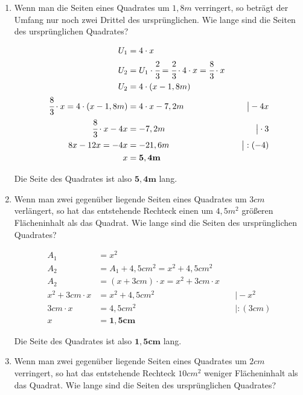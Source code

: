 \documentclass[a4paper,10pt]{article} %
\begin{document}
\begin{enumerate}
    Die Seite des Quadrates ist also \(\mathbf{5cm}\) lang.

  \item Wenn man die Seiten eines Quadrates um \(1,8m\) verringert, so beträgt der
    Umfang nur noch zwei Drittel des ursprünglichen.
    Wie lange sind die Seiten des ursprünglichen Quadrates?

    \[
      \begin{aligned}
        U_1 &= 4 \cdot x \\
        U_2 &= U_1 \cdot \cfrac{2}{3} = \cfrac{2}{3} \cdot 4 \cdot x = \cfrac{8}{3} \cdot x \\
        U_2 &= 4 \cdot (x - 1,8m) \\
        \cfrac{8}{3} \cdot x = 4 \cdot (x - 1,8m) &= 4 \cdot x - 7,2m &\quad\big| - 4x \\
        \cfrac{8}{3} \cdot x - 4x &= -7,2m &\quad\big| \cdot 3 \\
        8x - 12x = -4x &= -21,6m &\quad\big| : (-4) \\
        x &= \mathbf{5,4m}
      \end{aligned}
    \]

    Die Seite des Quadrates ist also \(\mathbf{5,4m}\) lang.

  \item Wenn man zwei gegenüber liegende Seiten eines Quadrates um \(3cm\) verlängert,
    so hat das entstehende Rechteck einen um \(4,5m^2\) größeren Flächeninhalt als das Quadrat.
    Wie lange sind die Seiten des ursprünglichen Quadrates?

    \[
      \begin{aligned}
        A_1 &= x^2 \\
        A_2 &= A_1 + 4,5cm^2 = x^2 + 4,5cm^2 \\
        A_2 &= (x + 3cm) \cdot x = x^2 + 3cm \cdot x \\
        x^2 + 3cm \cdot x &= x^2 + 4,5cm^2 &\quad\big| - x^2 \\
        3cm \cdot x &= 4,5cm^2 &\quad\big| : (3cm) \\
        x &= \mathbf{1,5cm}
      \end{aligned}
    \]

    Die Seite des Quadrates ist also \(\mathbf{1,5cm}\) lang.

  \item Wenn man zwei gegenüber liegende Seiten eines Quadrates um \(2cm\) verringert,
    so hat das entstehende Rechteck \(10cm^2\) weniger Flächeninhalt als das Quadrat.
    Wie lange sind die Seiten des ursprünglichen Quadrates?


\end{enumerate}
\end{document}

